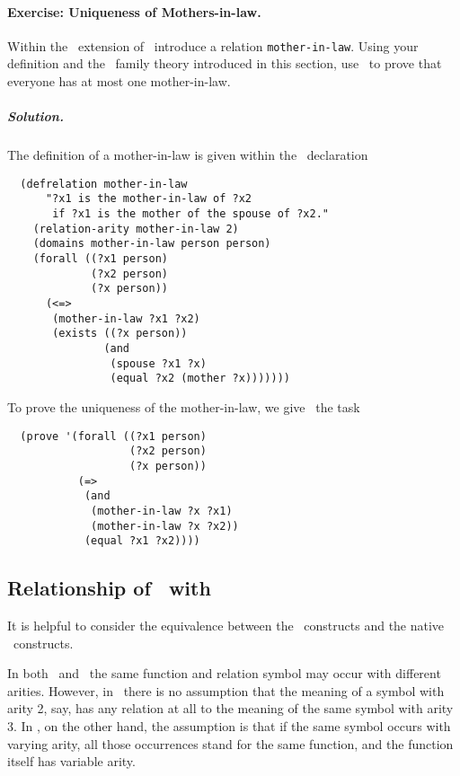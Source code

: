 \paragraph{Exercise: Uniqueness of Mothers-in-law.}
\label{exec-mother-in-law}
Within the \kif\  extension of \snark\  introduce a relation
\verb'mother-in-law'.  Using your definition and the \kif\   family theory
introduced in this section, use \snark\  to prove that everyone has at most
one mother-in-law.

\subparagraph{Solution.}  The definition of a mother-in-law is given within
the \kif\  declaration
\begin{verbatim}
  (defrelation mother-in-law
      "?x1 is the mother-in-law of ?x2
       if ?x1 is the mother of the spouse of ?x2."
    (relation-arity mother-in-law 2)
    (domains mother-in-law person person)
    (forall ((?x1 person)
             (?x2 person)
             (?x person))
      (<=>
       (mother-in-law ?x1 ?x2)
       (exists ((?x person))
               (and
                (spouse ?x1 ?x)
                (equal ?x2 (mother ?x)))))))
\end{verbatim}

To prove the uniqueness of the mother-in-law, we give \snark\  the task
\begin{samepage}
\begin{verbatim}
  (prove '(forall ((?x1 person)
                   (?x2 person)
                   (?x person))
           (=>
            (and
             (mother-in-law ?x ?x1)
             (mother-in-law ?x ?x2))
            (equal ?x1 ?x2))))
\end{verbatim}
\end{samepage}

\subsection{Relationship of \kifsnark\  with \snark}

It is helpful to consider the equivalence between the \kifsnark\
constructs and the native \snark\  constructs.

In both \snark\  and \kif\, the same function and relation symbol may
occur with different arities.  However, in \snark\  there is no
assumption that the meaning of a symbol with arity 2, say, has any
relation at all to the meaning of the same symbol with arity 3.  In
\kif\/, on the other hand, the assumption is that if the same symbol
occurs with varying arity, all those occurrences stand for the same
function, and the function itself has variable arity.


